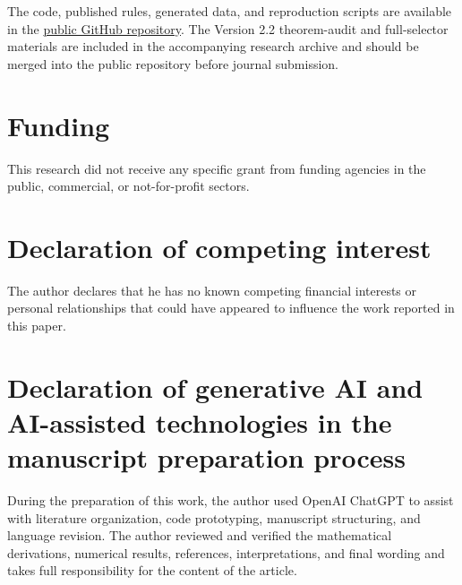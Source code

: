 \documentclass[preprint,12pt]{elsarticle}
\theoremstyle{remark}
\begin{document}
The code, published rules, generated data, and reproduction scripts are
available in the
\href{https://github.com/TurkeyOp/partial-moment-stieltjes-quadrature}{public GitHub repository}.
The Version 2.2 theorem-audit and full-selector materials are included in the
accompanying research archive and should be merged into the public
repository before journal submission.

\section*{Funding}

This research did not receive any specific grant from funding agencies
in the public, commercial, or not-for-profit sectors.

\section*{Declaration of competing interest}

The author declares that he has no known competing financial interests
or personal relationships that could have appeared to influence the
work reported in this paper.

\section*{Declaration of generative AI and AI-assisted technologies in
the manuscript preparation process}

During the preparation of this work, the author used OpenAI ChatGPT to
assist with literature organization, code prototyping, manuscript
structuring, and language revision. The author reviewed and verified
the mathematical derivations, numerical results, references,
interpretations, and final wording and takes full responsibility for
the content of the article.
\end{document}
